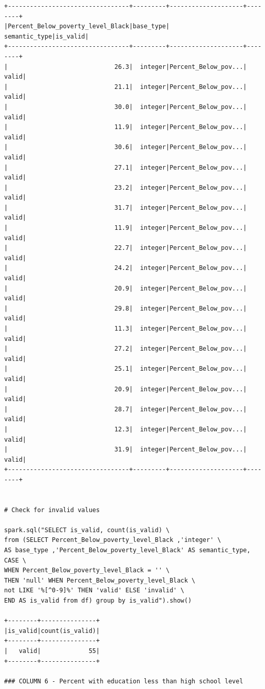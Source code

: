 \documentclass{article}
\begin{document}
\begin{verbatim}
+---------------------------------+---------+--------------------+--------+
|Percent_Below_poverty_level_Black|base_type|       semantic_type|is_valid|
+---------------------------------+---------+--------------------+--------+
|                             26.3|  integer|Percent_Below_pov...|   valid|
|                             21.1|  integer|Percent_Below_pov...|   valid|
|                             30.0|  integer|Percent_Below_pov...|   valid|
|                             11.9|  integer|Percent_Below_pov...|   valid|
|                             30.6|  integer|Percent_Below_pov...|   valid|
|                             27.1|  integer|Percent_Below_pov...|   valid|
|                             23.2|  integer|Percent_Below_pov...|   valid|
|                             31.7|  integer|Percent_Below_pov...|   valid|
|                             11.9|  integer|Percent_Below_pov...|   valid|
|                             22.7|  integer|Percent_Below_pov...|   valid|
|                             24.2|  integer|Percent_Below_pov...|   valid|
|                             20.9|  integer|Percent_Below_pov...|   valid|
|                             29.8|  integer|Percent_Below_pov...|   valid|
|                             11.3|  integer|Percent_Below_pov...|   valid|
|                             27.2|  integer|Percent_Below_pov...|   valid|
|                             25.1|  integer|Percent_Below_pov...|   valid|
|                             20.9|  integer|Percent_Below_pov...|   valid|
|                             28.7|  integer|Percent_Below_pov...|   valid|
|                             12.3|  integer|Percent_Below_pov...|   valid|
|                             31.9|  integer|Percent_Below_pov...|   valid|
+---------------------------------+---------+--------------------+--------+


# Check for invalid values

spark.sql("SELECT is_valid, count(is_valid) \  
from (SELECT Percent_Below_poverty_level_Black ,'integer' \  
AS base_type ,'Percent_Below_poverty_level_Black' AS semantic_type, CASE \  
WHEN Percent_Below_poverty_level_Black = '' \  
THEN 'null' WHEN Percent_Below_poverty_level_Black \  
not LIKE '%[^0-9]%' THEN 'valid' ELSE 'invalid' \  
END AS is_valid from df) group by is_valid").show()

+--------+---------------+
|is_valid|count(is_valid)|
+--------+---------------+
|   valid|             55|
+--------+---------------+

### COLUMN 6 - Percent with education less than high school level 


\end{verbatim}
\end{document}

